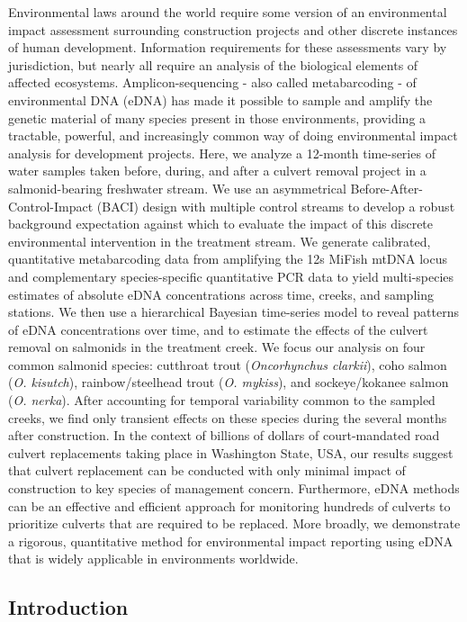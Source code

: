 \documentclass[
]{article}
\begin{document}
Environmental laws around the world require some version of an
environmental impact assessment surrounding construction projects and
other discrete instances of human development. Information requirements
for these assessments vary by jurisdiction, but nearly all require an
analysis of the biological elements of affected ecosystems.
Amplicon-sequencing - also called metabarcoding - of environmental DNA
(eDNA) has made it possible to sample and amplify the genetic material
of many species present in those environments, providing a tractable,
powerful, and increasingly common way of doing environmental impact
analysis for development projects. Here, we analyze a 12-month
time-series of water samples taken before, during, and after a culvert
removal project in a salmonid-bearing freshwater stream. We use an
asymmetrical Before-After-Control-Impact (BACI) design with multiple
control streams to develop a robust background expectation against which
to evaluate the impact of this discrete environmental intervention in
the treatment stream. We generate calibrated, quantitative metabarcoding
data from amplifying the 12s MiFish mtDNA locus and complementary
species-specific quantitative PCR data to yield multi-species estimates
of absolute eDNA concentrations across time, creeks, and sampling
stations. We then use a hierarchical Bayesian time-series model to
reveal patterns of eDNA concentrations over time, and to estimate the
effects of the culvert removal on salmonids in the treatment creek. We
focus our analysis on four common salmonid species: cutthroat trout
(\emph{Oncorhynchus clarkii}), coho salmon (\emph{O. kisutch}),
rainbow/steelhead trout (\emph{O. mykiss}), and sockeye/kokanee salmon
(\emph{O. nerka}). After accounting for temporal variability common to
the sampled creeks, we find only transient effects on these species
during the several months after construction. In the context of billions
of dollars of court-mandated road culvert replacements taking place in
Washington State, USA, our results suggest that culvert replacement can
be conducted with only minimal impact of construction to key species of
management concern. Furthermore, eDNA methods can be an effective and
efficient approach for monitoring hundreds of culverts to prioritize
culverts that are required to be replaced. More broadly, we demonstrate
a rigorous, quantitative method for environmental impact reporting using
eDNA that is widely applicable in environments worldwide.

\newpage

\hypertarget{introduction}{%
\subsection{Introduction}\label{introduction}}
\end{document}
